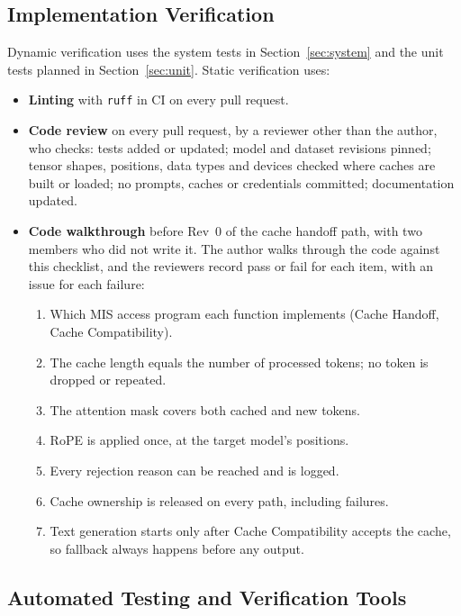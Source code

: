 \documentclass[12pt, titlepage]{article}
\begin{document}
\subsection{Implementation Verification}

Dynamic verification uses the system tests in Section~\ref{sec:system} and
the unit tests planned in Section~\ref{sec:unit}. Static verification uses:

\begin{itemize}
  \item \textbf{Linting} with \texttt{ruff} in CI on every pull request.
  \item \textbf{Code review} on every pull request, by a reviewer other than
  the author, who checks: tests added or updated; model and dataset
  revisions pinned; tensor shapes, positions, data types and devices
  checked where caches are built or loaded; no prompts, caches or
  credentials committed; documentation updated.
  \item \textbf{Code walkthrough} before Rev~0 of the cache handoff path,
  with two members who did not write it. The author walks through the code
  against this checklist, and the reviewers record pass or fail for each
  item, with an issue for each failure:
  \begin{enumerate}[noitemsep]
    \item Which MIS access program each function implements (Cache
    Handoff, Cache Compatibility).
    \item The cache length equals the number of processed tokens; no token
    is dropped or repeated.
    \item The attention mask covers both cached and new tokens.
    \item RoPE is applied once, at the target model's positions.
    \item Every rejection reason can be reached and is logged.
    \item Cache ownership is released on every path, including failures.
    \item Text generation starts only after Cache Compatibility accepts the
    cache, so fallback always happens before any output.
  \end{enumerate}
\end{itemize}

\subsection{Automated Testing and Verification Tools}
\label{sec:tools}
\end{document}
